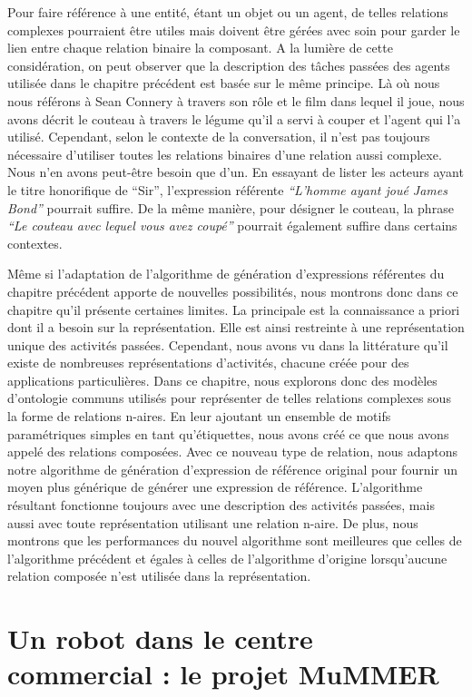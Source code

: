 Pour faire référence à une entité, étant un objet ou un agent, de telles relations complexes pourraient être utiles mais doivent être gérées avec soin pour garder le lien entre chaque relation binaire la composant. A la lumière de cette considération, on peut observer que la description des tâches passées des agents utilisée dans le chapitre précédent est basée sur le même principe. Là où nous nous référons à Sean Connery à travers son rôle et le film dans lequel il joue, nous avons décrit le couteau à travers le légume qu'il a servi à couper et l'agent qui l'a utilisé. Cependant, selon le contexte de la conversation, il n'est pas toujours nécessaire d'utiliser toutes les relations binaires d'une relation aussi complexe. Nous n'en avons peut-être besoin que d'un. En essayant de lister les acteurs ayant le titre honorifique de ``Sir'', l'expression référente \textit{``L'homme ayant joué James Bond''} pourrait suffire. De la même manière, pour désigner le couteau, la phrase \textit{``Le couteau avec lequel vous avez coupé''} pourrait également suffire dans certains contextes. 

Même si l'adaptation de l'algorithme de génération d'expressions référentes du chapitre précédent apporte de nouvelles possibilités, nous montrons donc dans ce chapitre qu'il présente certaines limites. La principale est la connaissance a priori dont il a besoin sur la représentation. Elle est ainsi restreinte à une représentation unique des activités passées. Cependant, nous avons vu dans la littérature qu'il existe de nombreuses représentations d'activités, chacune créée pour des applications particulières. Dans ce chapitre, nous explorons donc des modèles d'ontologie communs utilisés pour représenter de telles relations complexes sous la forme de relations n-aires. En leur ajoutant un ensemble de motifs paramétriques simples en tant qu'étiquettes, nous avons créé ce que nous avons appelé des relations composées. Avec ce nouveau type de relation, nous adaptons notre algorithme de génération d'expression de référence original pour fournir un moyen plus générique de générer une expression de référence. L'algorithme résultant fonctionne toujours avec une description des activités passées, mais aussi avec toute représentation utilisant une relation n-aire. De plus, nous montrons que les performances du nouvel algorithme sont meilleures que celles de l'algorithme précédent et égales à celles de l'algorithme d'origine lorsqu'aucune relation composée n'est utilisée dans la représentation.

\section*{Un robot dans le centre commercial : le projet MuMMER}

